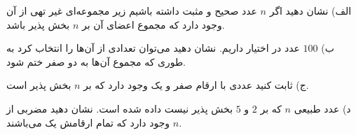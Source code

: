\EXERCISE
الف) نشان دهید اگر
$n$
عدد صحیح و مثبت داشته باشیم زیر مجموعه‌ای غیر تهی از آن وجود دارد که مجموع اعضای آن بر
$n$
بخش پذیر باشد.

ب)
$100$
عدد در اختیار داریم. نشان دهید می‌توان تعدادی از آن‌ها را انتخاب کرد به طوری که مجموع آن‌ها به دو صفر ختم شود.

ج) ثابت کنید عددی با ارقام صفر و یک وجود دارد که بر
$n$
بخش پذیر است.

د) عدد طبیعی
$n$
که بر
$2$
و
$5$
بخش پذیر نیست داده شده است. نشان دهید مضربی از
$n$
وجود دارد که تمام ارقامش یک می‌باشند.